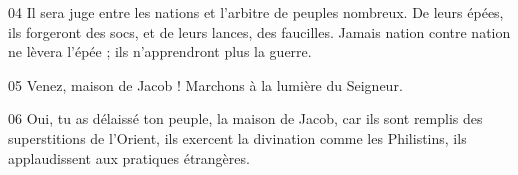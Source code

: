 
04 Il sera juge entre les nations et l’arbitre de peuples nombreux. De leurs épées, ils forgeront des socs, et de leurs lances, des faucilles. Jamais nation contre nation ne lèvera l’épée ; ils n’apprendront plus la guerre.

05 Venez, maison de Jacob ! Marchons à la lumière du Seigneur.

06 Oui, tu as délaissé ton peuple, la maison de Jacob, car ils sont remplis des superstitions de l’Orient, ils exercent la divination comme les Philistins, ils applaudissent aux pratiques étrangères.
